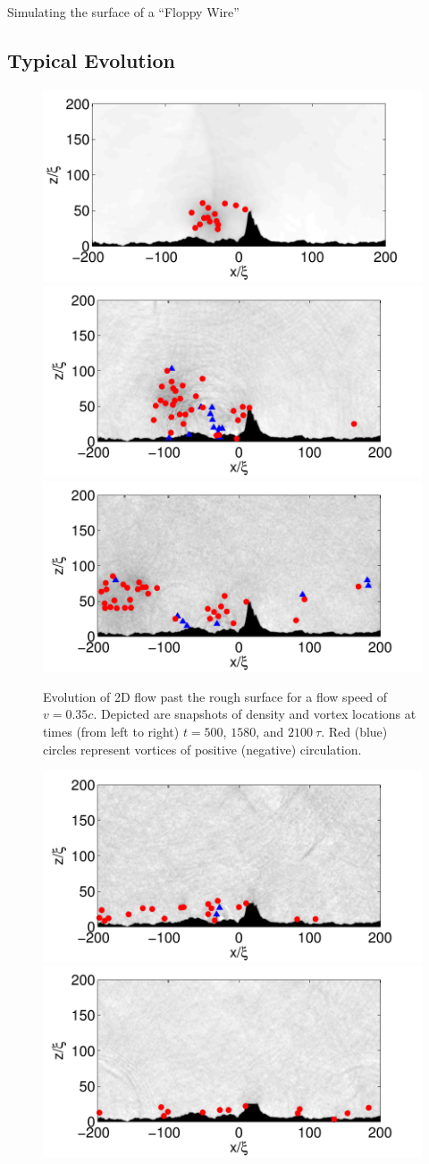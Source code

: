 \begin{chapter}{\label{cha:afm}Simulating the surface of a ``Floppy Wire''}
\subsection{Typical Evolution}

\begin{figure}
\includegraphics[width=0.35\linewidth]{./afm/figures/prog-35-500}\hspace{-0.6cm}
\includegraphics[width=0.35\linewidth]{./afm/figures/prog-35-1580}\hspace{-0.6cm}
\includegraphics[width=0.35\linewidth]{./afm/figures/prog-35-2100}
\caption{\label{fig:prog} Evolution of 2D flow past the rough surface for a flow speed of $v=0.35c$.  Depicted are snapshots of density and vortex locations at times (from left to right) $t=500$, $1580$, and $2100~\tau$.  Red (blue) circles represent vortices of positive (negative) circulation.  }%
\end{figure}
\begin{figure}
\includegraphics[width=0.35\linewidth]{./afm/figures/6th-35-2440}\hspace{-0.6cm}
\includegraphics[width=0.35\linewidth]{./afm/figures/8th-35-2440}\hspace{-0.6cm}

\end{figure}
\end{chapter}

